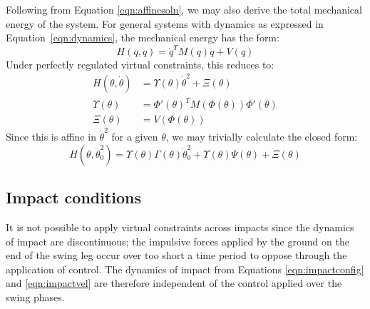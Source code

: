 Following from Equation \ref{eqn:affinesoln}, we may also derive the total mechanical energy of the system. For general systems with dynamics as expressed in Equation~\ref{eqn:dynamics}, the mechanical energy has the form:
\[ H\left(q,\dot{q}\right) = \dot{q}^TM(q)\dot{q} + V(q) \]
Under perfectly regulated virtual constraints, this reduces to:
\begin{align*}
	H\left(\theta,\dot{\theta}\right) &= \Upsilon(\theta)\dot{\theta}^2+\Xi(\theta) \\
	\Upsilon(\theta) &= \Phi'(\theta)^TM\left(\Phi(\theta)\right)\Phi'(\theta) \\
	\Xi(\theta) &= V\left(\Phi(\theta)\right)
\end{align*}
Since this is affine in $\dot{\theta}^2$ for a given $\theta$, we may trivially calculate the closed form:
\begin{equation}
	H\left(\theta, \dot{\theta}_0^2\right) =
	\Upsilon(\theta)\Gamma\left(\theta\right)\dot{\theta}_0^2 +
	\Upsilon(\theta)\Psi\left(\theta\right) + \Xi(\theta)
\end{equation}

\subsection{Impact conditions} \label{sec:impact}
It is not possible to apply virtual constraints across impacts since the dynamics of impact are discontinuous; the impulsive forces applied by the ground on the end of the swing leg occur over too short a time period to oppose through the application of control. The dynamics of impact from Equations \ref{eqn:impactconfig} and \ref{eqn:impactvel} are therefore independent of the control applied over the swing phases. 

